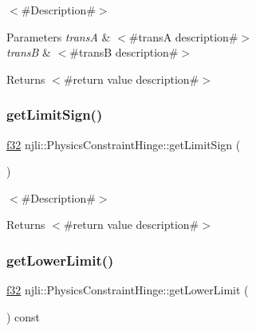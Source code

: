 $<$\#\+Description\#$>$


\begin{DoxyParams}{Parameters}
{\em transA} & $<$\#transA description\#$>$ \\
\hline
{\em transB} & $<$\#transB description\#$>$\\
\hline
\end{DoxyParams}
\begin{DoxyReturn}{Returns}
$<$\#return value description\#$>$ 
\end{DoxyReturn}
\mbox{\label{classnjli_1_1_physics_constraint_hinge_a4e4531b90a04163f97716276d0bb0c81}} 
\subsubsection{\texorpdfstring{get\+Limit\+Sign()}{getLimitSign()}}
{\footnotesize\ttfamily \mbox{\hyperlink{_util_8h_a5f6906312a689f27d70e9d086649d3fd}{f32}} njli\+::\+Physics\+Constraint\+Hinge\+::get\+Limit\+Sign (\begin{DoxyParamCaption}{ }\end{DoxyParamCaption})}

$<$\#\+Description\#$>$

\begin{DoxyReturn}{Returns}
$<$\#return value description\#$>$ 
\end{DoxyReturn}
\mbox{\label{classnjli_1_1_physics_constraint_hinge_a4df6c7953c16257d85669a7f7c786809}} 
\subsubsection{\texorpdfstring{get\+Lower\+Limit()}{getLowerLimit()}}
{\footnotesize\ttfamily \mbox{\hyperlink{_util_8h_a5f6906312a689f27d70e9d086649d3fd}{f32}} njli\+::\+Physics\+Constraint\+Hinge\+::get\+Lower\+Limit (\begin{DoxyParamCaption}{ }\end{DoxyParamCaption}) const}

